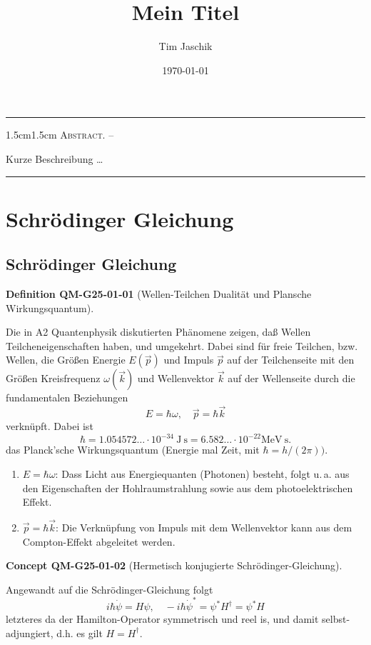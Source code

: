 \documentclass[10pt, letterpaper]{article}
\title{Mein Titel}
\author{Tim Jaschik}
\date{\today}
\renewenvironment{abstract}
  {
    \begin{adjustwidth}{1.5cm}{1.5cm}
    \small
    \textsc{Abstract. –}%
  }
  {
    \end{adjustwidth}
  }
\newcommand{\CustomHeading}[3]{%
  \par\medskip\noindent%
  \textbf{#1 #2} \textnormal{(#3)}.\enskip%
}
\newenvironment{DEF}[2]{\CustomHeading{Definition}{#1}{#2}}{}
\newenvironment{CONC}[2]{\CustomHeading{Concept}{#1}{#2}}{}
\begin{document}
\maketitle
\rule{\textwidth}{0.5pt}
\begin{abstract}
Kurze Beschreibung …
\end{abstract}
\rule{\textwidth}{0.5pt}
\vspace{0.5cm}

\tableofcontents

\pagebreak

\section{Schrödinger Gleichung}

\subsection{Schrödinger Gleichung}

\begin{DEF}{QM-G25-01-01}{Wellen-Teilchen Dualität und Plansche Wirkungsquantum}
Die in A2 Quantenphysik diskutierten Phänomene zeigen, daß Wellen Teilcheneigenschaften haben, und umgekehrt. Dabei sind für freie Teilchen, bzw. Wellen, die Größen Energie $E(\vec{p})$ und Impuls $\vec{p}$ auf der Teilchenseite mit den Größen Kreisfrequenz $\omega(\vec{k})$ und Wellenvektor $\vec{k}$ auf der Wellenseite durch die fundamentalen Beziehungen
$$
E=\hbar \omega, \quad \vec{p}=\hbar \vec{k}
$$
verknüpft. Dabei ist
$$
\hbar=1.054572 \ldots \cdot 10^{-34} \mathrm{~J} \mathrm{~s}=6.582 \ldots \cdot 10^{-22} \mathrm{MeV} \mathrm{~s} .
$$
das Planck'sche Wirkungsquantum (Energie mal Zeit, mit $\hbar=h /(2 \pi))$.
\begin{enumerate}
  \item $E = \hbar \omega$: Dass Licht aus Energiequanten (Photonen) besteht, folgt u.\,a. aus den Eigenschaften der Hohlraumstrahlung sowie aus dem photoelektrischen Effekt.
  \item $\vec{p} = \hbar \vec{k}$: Die Verknüpfung von Impuls mit dem Wellenvektor kann aus dem Compton-Effekt abgeleitet werden.
\end{enumerate}
\end{DEF}

\begin{CONC}{QM-G25-01-02}{Hermetisch konjugierte Schrödinger-Gleichung}
Angewandt auf die Schrödinger-Gleichung folgt
$$
i \hbar \dot{\psi}=H \psi, \quad-i \hbar \dot{\psi}^{*}=\psi^{*} H^{\dagger}=\psi^{*} H
$$
letzteres da der Hamilton-Operator symmetrisch und reel is, und damit selbst-adjungiert, d.h. es gilt $H=H^{\dagger}$.
\end{CONC}
\end{document}
